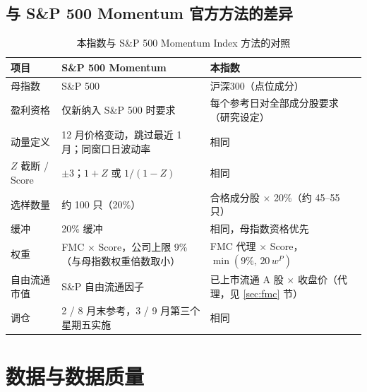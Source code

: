 \documentclass[11pt,a4paper]{article}
\begin{document}
\subsection{与 S\&P 500 Momentum 官方方法的差异}
\begin{table}[!htbp]
\centering
\small
\caption{本指数与 S\&P 500 Momentum Index 方法的对照}\label{tab:diff}
\begin{tabular}{@{}p{2.3cm}p{6.3cm}p{6.3cm}@{}}
\toprule
项目 & S\&P 500 Momentum & 本指数 \\
\midrule
母指数 & S\&P 500 & 沪深300（点位成分） \\
盈利资格 & 仅新纳入 S\&P 500 时要求 & 每个参考日对全部成分股要求（研究设定） \\
动量定义 & 12 月价格变动，跳过最近 1 月；同窗口日波动率 & 相同 \\
$Z$ 截断 / Score & $\pm 3$；$1+Z$ 或 $1/(1-Z)$ & 相同 \\
选样数量 & 约 100 只（20\%） & 合格成分股 $\times$ 20\%（约 45--55 只） \\
缓冲 & 20\% 缓冲 & 相同，母指数资格优先 \\
权重 & FMC $\times$ Score，公司上限 9\%（与母指数权重倍数取小） & FMC 代理 $\times$ Score，$\min(9\%,\,20\,w^P)$ \\
自由流通市值 & S\&P 自由流通因子 & 已上市流通 A 股 $\times$ 收盘价（代理，见 \ref{sec:fmc} 节） \\
调仓 & 2 / 8 月末参考，3 / 9 月第三个星期五实施 & 相同 \\
\bottomrule
\end{tabular}
\end{table}

\section{数据与数据质量}\label{sec:data}
\FloatBarrier
\end{document}
